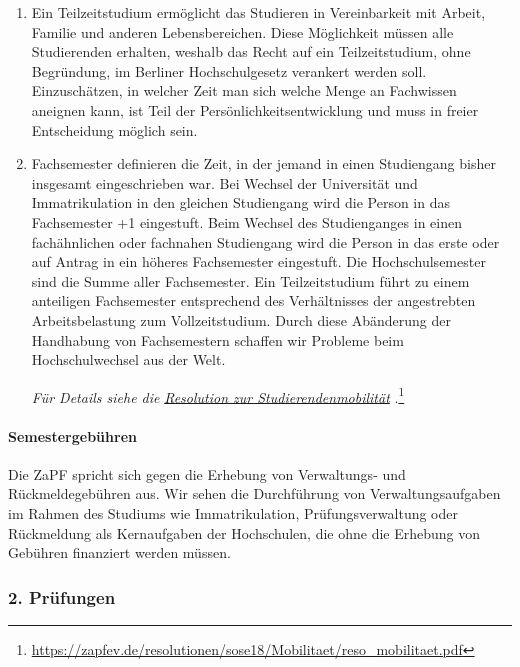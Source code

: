 \documentclass[DIV=calc]{scrartcl}
\begin{document}
\begin{enumerate}
\item Ein Teilzeitstudium ermöglicht das Studieren in Vereinbarkeit mit Arbeit, Familie und anderen Lebensbereichen. Diese Möglichkeit müssen alle Studierenden erhalten, weshalb das Recht auf ein Teilzeitstudium, ohne Begründung, im Berliner Hochschulgesetz verankert werden soll. Einzuschätzen, in welcher Zeit man sich welche Menge an Fachwissen aneignen kann, ist Teil der Persönlichkeitsentwicklung und muss in freier Entscheidung möglich sein.

\item Fachsemester definieren die Zeit, in der jemand in einen Studiengang bisher insgesamt eingeschrieben war. Bei Wechsel der Universität und Immatrikulation in den gleichen Studiengang wird die Person in das Fachsemester +1 eingestuft. Beim Wechsel des Studienganges in einen fachähnlichen oder fachnahen Studiengang wird die Person in das erste oder auf Antrag in ein höheres Fachsemester eingestuft. Die Hochschulsemester sind die Summe aller Fachsemester. Ein Teilzeitstudium führt zu einem anteiligen Fachsemester entsprechend des Verhältnisses der angestrebten Arbeitsbelastung zum Vollzeitstudium. Durch diese Abänderung der Handhabung von Fachsemestern schaffen wir Probleme beim Hochschulwechsel aus der Welt.

  \emph{Für Details siehe die
    }\href{https://zapfev.de/resolutionen/sose18/Mobilitaet/reso_mobilitaet.pdf}{\emph{Resolution zur Studierendenmobilität}}%
.\footnote{\url{https://zapfev.de/resolutionen/sose18/Mobilitaet/reso_mobilitaet.pdf}}
  \end{enumerate}

\hypertarget{semestergebuxfchren}{%
\paragraph{Semestergebühren}\label{semestergebuxfchren}}

Die ZaPF spricht sich gegen die Erhebung von Verwaltungs- und
Rückmeldegebühren aus. Wir sehen die Durchführung von
Verwaltungsaufgaben im Rahmen des Studiums wie Immatrikulation,
Prüfungsverwaltung oder Rückmeldung als Kernaufgaben der
Hochschulen, die ohne die Erhebung von Gebühren finanziert werden
müssen.


\hypertarget{pruxfcfungen}{%
\subsubsection*{2. Prüfungen}\label{pruxfcfungen}}
\end{document}
